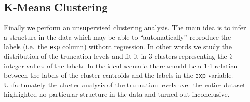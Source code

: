 \subsection{K-Means Clustering}\label{sec:eda:kmeans}

Finally we perform an unsupervised clustering analysis.
The main idea is to infer a structure in the data which may be able to
``automatically'' reproduce the labels (i.e.\ the \texttt{exp} column) without
regression.
In other words we study the distribution of the truncation levels and fit it in
3 clusters representing the 3 integer values of the labels.
In the ideal scenario there should be a 1:1 relation between the labels of the
cluster centroids and the labels in the \texttt{exp} variable. Unfortunately
the cluster analysis of the truncation levels over the entire dataset
highlighted no particular structure in the data and turned out inconclusive.

